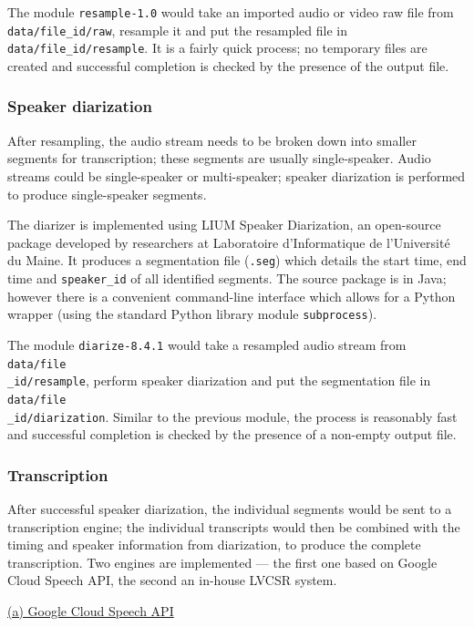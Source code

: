 The module \texttt{resample-1.0} would take an imported audio or video raw file from \texttt{data/file\_id/raw}, resample it and put the resampled file in \texttt{data/file\_id/resample}. It is a fairly quick process; no temporary files are created and successful completion is checked by the presence of the output file.

\subsubsection{Speaker diarization}

After resampling, the audio stream needs to be broken down into smaller segments for transcription; these segments are usually single-speaker. Audio streams could be single-speaker or multi-speaker; speaker diarization is performed to produce single-speaker segments.

The diarizer is implemented using LIUM Speaker Diarization, an open-source package developed by researchers at Laboratoire d'Informatique de l'Université du Maine. It produces a segmentation file (\texttt{.seg}) which details the start time, end time and \texttt{speaker\_id} of all identified segments. The source package is in Java; however there is a convenient command-line interface which allows for a Python wrapper (using the standard Python library module \texttt{subprocess}).

The module \texttt{diarize-8.4.1} would take a resampled audio stream from \texttt{data/file\\ \_id/resample}, perform speaker diarization and put the segmentation file in \texttt{data/file\\ \_id/diarization}. Similar to the previous module, the process is reasonably fast and successful completion is checked by the presence of a non-empty output file.

\subsubsection{Transcription}

After successful speaker diarization, the individual segments would be sent to a transcription engine; the individual transcripts would then be combined with the timing and speaker information from diarization, to produce the complete transcription. Two engines are implemented --- the first one based on Google Cloud Speech API, the second an in-house LVCSR system.

\underline{(a) Google Cloud Speech API}

